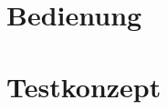 \documentclass{fhnwreport/fhnwreport}
\begin{document}
\section{Bedienung}
\label{sec:bedienung}


\clearpage
\section{Testkonzept}
\label{sec:testkonzept}


%



%
\end{document}
